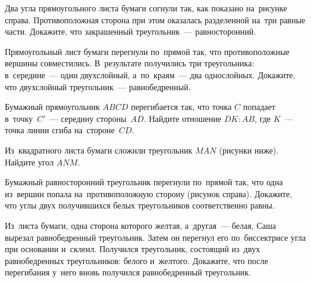 \begin{problems}
\item
\begin{minipage}[t][][t]{0.62\linewidth}
Два угла прямоугольного листа бумаги согнули так, как показано на~рисунке
справа.
Противоположная сторона при этом оказалась разделенной на~три равные части.
Докажите, что закрашенный треугольник~--- равносторонний.
\end{minipage}\hfill
\begin{minipage}[t][][b]{0.35\linewidth}\vspace{-1ex}\flushright
{}
\vspace{1ex}
\end{minipage}

\item
Прямоугольный лист бумаги перегнули по~прямой так, что противоположные вершины
совместились.
В~результате получились три треугольника: в~середине~--- один двухслойный,
а~по~краям~--- два однослойных.
Докажите, что двухслойный треугольник~--- равнобедренный.

\item
Бумажный прямоугольник $ABCD$ перегибается так, что точка $C$ попадает
в~точку~$C'$~--- середину стороны~$AD$.
Найдите отношение $DK : AB$, где $K$~--- точка линии сгиба на~стороне~$CD$.

\pagebreak[3]

\item
Из~квадратного листа бумаги сложили треугольник $MAN$ (рисунки ниже).
Найдите угол $ANM$.
\begin{center}
\qquad
{}
\end{center}

\item
\begin{minipage}[t][][t]{0.70\linewidth}
Бумажный равносторонний треугольник перегнули по~прямой так, что одна из~вершин
попала на~противоположную сторону (рисунок справа).
Докажите, что углы двух получившихся белых треугольников соответственно равны.
\end{minipage}\hfill
\begin{minipage}[t][][b]{0.27\linewidth}\vspace{-1ex}\flushright
{}
\vspace{1ex}
\end{minipage}

\item
Из~листа бумаги, одна сторона которого желтая, а~другая~--- белая, Саша вырезал
равнобедренный треугольник.
Затем он перегнул его по~биссектрисе угла при основании и~склеил.
Получился треугольник, состоящий из~двух равнобедренных треугольников: белого
и~желтого.
Докажите, что после перегибания у~него вновь получился равнобедренный
треугольник.


\end{problems}
